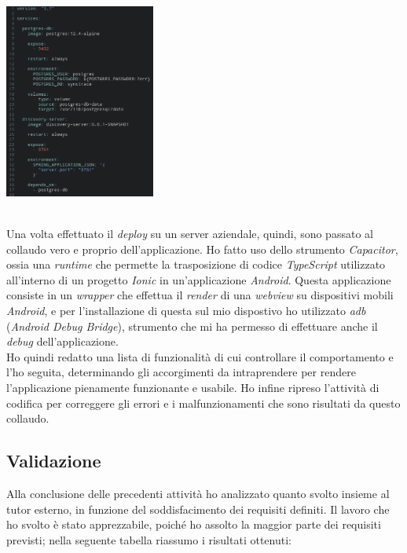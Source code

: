 \begin{minipage}{\linewidth}
  \centering
    \includegraphics[height=6.4cm]{immagini/dockeryml}
\end{minipage} \\

Una volta effettuato il \textit{deploy} su un server aziendale, quindi, sono passato al collaudo vero e proprio dell'applicazione. Ho fatto uso dello strumento \textit{Capacitor}, ossia una \textit{runtime} che permette la trasposizione di codice \textit{TypeScript} utilizzato all'interno di un progetto \textit{Ionic} in un'applicazione \textit{Android}. Questa applicazione consiste in un \textit{wrapper} che effettua il \textit{render} di una \textit{webview} su dispositivi mobili \textit{Android}, e per l'installazione di questa sul mio dispostivo ho utilizzato \textit{adb} (\textit{Android Debug Bridge}), strumento che mi ha permesso di effettuare anche il \textit{debug} dell'applicazione. \\
Ho quindi redatto una lista di funzionalità di cui controllare il comportamento e l'ho seguita, determinando gli accorgimenti da intraprendere per rendere l'applicazione pienamente funzionante e usabile. Ho infine ripreso l'attività di codifica per correggere gli errori e i malfunzionamenti che sono risultati da questo collaudo.

\subsection*{Validazione}

Alla conclusione delle precedenti attività ho analizzato quanto svolto insieme al tutor esterno, in funzione del soddisfacimento dei requisiti definiti. Il lavoro che ho svolto è stato apprezzabile, poiché ho assolto la maggior parte dei requisiti previsti; nella seguente tabella riassumo i risultati ottenuti:


